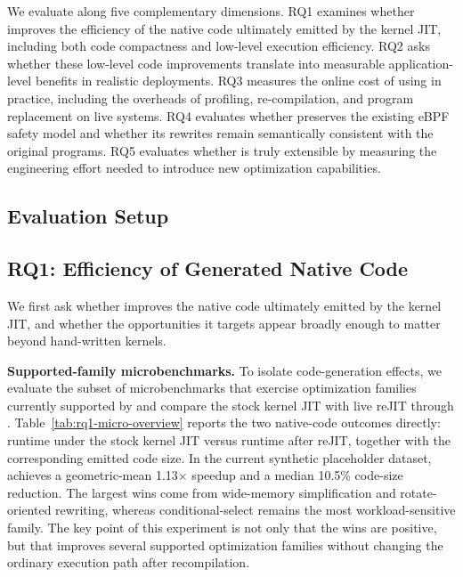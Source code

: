 We evaluate \tool along five complementary dimensions. 
%
RQ1 examines whether \tool improves the efficiency of the native code ultimately emitted by the kernel JIT, including both code compactness and low-level execution efficiency.
%
RQ2 asks whether these low-level code improvements translate into measurable application-level benefits in realistic deployments.
%
RQ3 measures the online cost of using \tool in practice, including the overheads of profiling, re-compilation, and program replacement on live systems.
%
RQ4 evaluates whether \tool preserves the existing eBPF safety model and whether its rewrites remain semantically consistent with the original programs.
%
RQ5 evaluates whether \tool is truly extensible by measuring the engineering effort needed to introduce new optimization capabilities.


\subsection{Evaluation Setup}
\label{subsec:evaluation-setup}



\subsection{RQ1: Efficiency of Generated Native Code}
\label{subsec:rq1}

We first ask whether \tool improves the native code ultimately emitted by the kernel JIT, and whether the opportunities it targets appear broadly enough to matter beyond hand-written kernels.

\noindent\textbf{Supported-family microbenchmarks.}
To isolate code-generation effects, we evaluate the subset of microbenchmarks that exercise optimization families currently supported by \tool and compare the stock kernel JIT with live reJIT through \tool. Table~\ref{tab:rq1-micro-overview} reports the two native-code outcomes directly: runtime under the stock kernel JIT versus runtime after reJIT, together with the corresponding emitted code size. In the current synthetic placeholder dataset, \tool achieves a geometric-mean 1.13$\times$ speedup and a median 10.5\% code-size reduction. The largest wins come from wide-memory simplification and rotate-oriented rewriting, whereas conditional-select remains the most workload-sensitive family. The key point of this experiment is not only that the wins are positive, but that \tool improves several supported optimization families without changing the ordinary execution path after recompilation.

